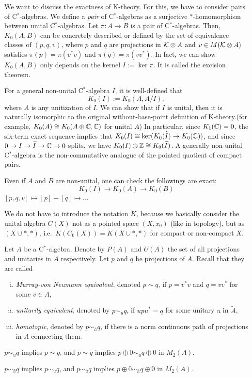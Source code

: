 \documentclass{../../large}
\begin{document}
\begin{prb}
We want to discuss the exactness of K-theory.
For this, we have to consider pairs of C$^*$-algebras.
We define a \emph{pair} of C$^*$-algebras as a surjective $*$-homomorphism between unital C$^*$-algebras.
Let $\pi:A\to B$ is a pair of C$^*$-algebras.
Then, $K_0(A,B)$ can be concretely described or defined by the set of equivalence classes of $(p,q,v)$, where $p$ and $q$ are projections in $\mathcal{K}\otimes A$ and $v\in M(\mathcal{K}\otimes A)$ satisfies $\pi(p)=\pi(v^*v)$ and $\pi(q)=\pi(vv^*)$.
In fact, we can show $K_0(A,B)$ only depends on the kernel $I:=\ker\pi$.
It is called the excision theorem.



For a general non-unital C$^*$-algebra $I$, it is well-defined that
\[K_0(I):=K_0(A,A/I),\]
where $A$ is any unitization of $I$.
We can show that if $I$ is unital, then it is naturally isomorphic to the original without-base-point definition of K-theory.(for example, $K_0(A)\cong K_0(A\oplus\mathbb{C},\mathbb{C})$ for unital $A$)
In particular, since $K_1(\mathbb{C})=0$, the six-term exact sequence implies that $K_0(I)\cong\ker(K_0(\widetilde I)\to K_0(\mathbb{C}))$, and since $0\to I\to\widetilde I\to\mathbb{C}\to0$ splits, we have $K_0(I)\oplus\mathbb{Z}\cong K_0(\widetilde I)$.
A generally non-unital C$^*$-algebra is the non-commutative analogue of the pointed quotient of compact pairs.


Even if $A$ and $B$ are non-unital, one can check the followings are exact:
\[K_0(I)\to K_0(A)\to K_0(B)\]
$[p,q,v]\mapsto[p]-[q]\mapsto$...

We do not have to introduce the notation $\tilde K$, because we basically consider the unital algebra $C(X)$ not as a pointed space $(X,x_0)$ (like in topology), but as $(X\cup*,*)$, i.e.~$K(C_0(X))=\tilde K(X\cup*,*)$ for compact or non-compact $X$.
\end{prb}




\begin{prb}
Let $A$ be a C$^*$-algebra.
Denote by $P(A)$ and $U(A)$ the set of all projections and unitaries in $A$ respectively.
Let $p$ and $q$ be projections of $A$.
Recall that they are called
\begin{enumerate}[(i)]
\item \emph{Murray-von Neumann equivalent}, denoted $p\sim q$, if $p=v^*v$ and $q=vv^*$ for some $v\in A$,
\item \emph{unitarily equivalent}, denoted by $p\sim_uq$, if $upu^*=q$ for some unitary $u$ in $\tilde A$,
\item \emph{homotopic}, denoted by $p\sim_hq$, if there is a norm continuous path of projections in $A$ connecting them.
\end{enumerate}
\begin{parts}
\item $p\sim_uq$ implies $p\sim q$, and $p\sim q$ implies $p\oplus0\sim_uq\oplus0$ in $M_2(A)$.
\item $p\sim_hq$ implies $p\sim_uq$, and $p\sim_uq$ implies $p\oplus0\sim_hq\oplus0$ in $M_2(A)$.
\end{parts}
\end{prb}
\end{document}
